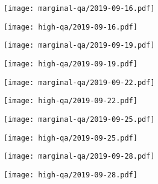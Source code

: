 \documentclass{article}
\begin{document}
\begin{figure}[H]
	\ContinuedFloat
	\centering
	\begin{subfigure}{0.48\linewidth}
		\texttt{[image: marginal-qa/2019-09-16.pdf]}
	\end{subfigure}
	\begin{subfigure}{0.48\linewidth}
		\texttt{[image: high-qa/2019-09-16.pdf]}
	\end{subfigure}
	\begin{subfigure}{0.48\linewidth}
		\texttt{[image: marginal-qa/2019-09-19.pdf]}
	\end{subfigure}
	\begin{subfigure}{0.48\linewidth}
		\texttt{[image: high-qa/2019-09-19.pdf]}
	\end{subfigure}
	\begin{subfigure}{0.48\linewidth}
		\texttt{[image: marginal-qa/2019-09-22.pdf]}
	\end{subfigure}
	\begin{subfigure}{0.48\linewidth}
		\texttt{[image: high-qa/2019-09-22.pdf]}
	\end{subfigure}
	\begin{subfigure}{0.48\linewidth}
		\texttt{[image: marginal-qa/2019-09-25.pdf]}
	\end{subfigure}
	\begin{subfigure}{0.48\linewidth}
		\texttt{[image: high-qa/2019-09-25.pdf]}
	\end{subfigure}
	\begin{subfigure}{0.48\linewidth}
		\texttt{[image: marginal-qa/2019-09-28.pdf]}
	\end{subfigure}
	\begin{subfigure}{0.48\linewidth}
		\texttt{[image: high-qa/2019-09-28.pdf]}
	\end{subfigure}
\end{figure}
\end{document}
